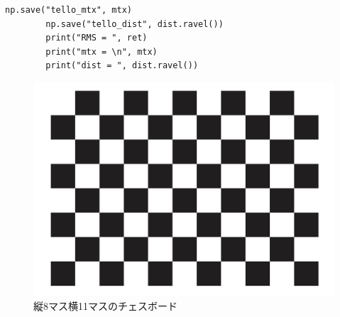 \begin{lstlisting}[caption=calibration code,label=calib_code]
        np.save("tello_mtx", mtx)                                                                                                                            
        np.save("tello_dist", dist.ravel())                                                                                                                  
        print("RMS = ", ret)                                                                                                                                 
        print("mtx = \n", mtx)                                                                                                                               
        print("dist = ", dist.ravel())                                                                                                                       
\end{lstlisting}

\begin{figure}[htbp]
  \begin{center}
    \includegraphics[clip,width=15.0cm]{img/chessboard.jpg}
    \caption{縦8マス横11マスのチェスボード}
    \label{chessboard}
  \end{center}
\end{figure}